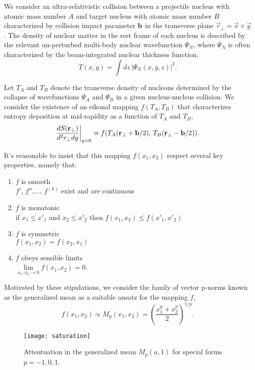 \documentclass[aps,prl,reprint,amsmath,nofootinbib]{revtex4-1}
\begin{document}
We consider an ultra-relativistic collision between a projectile nucleus with atomic mass number $A$ and target nucleus with atomic mass number $B$ characterized 
by collision impact parameter ${\bf b}$ in the transverse plane $\vec{r}_\perp = \vec{x} \times \vec{y}$. The density of nuclear matter in the rest frame of each 
nucleus is described by the relevant un-perturbed multi-body nuclear wavefunction $\Psi_N$, where $\Psi_N$ is often characterized by the beam-integrated 
nuclear thickness function,
\begin{equation}
 T(x,y) = \int dz\, \left|\Psi_N(x,y,z) \right|^2. 
\end{equation}

Let $T_A$ and $T_B$ denote the transverse density of nucleons determined by the collapse of wavefunctions $\Psi_A$ and $\Psi_B$ in a given nucleus-nucleus 
collision. We consider the existence of an eikonal mapping $f(T_A,T_B)$ that characterizes entropy deposition at mid-rapidity as a function of $T_A$ and $T_B$,
\begin{equation}
  \label{ansatz}
  \frac{dS({\bf r}_\perp)}{d^2r_\perp dy} \biggr \rvert_{y=0}  = f(T_A({\bf r}_\perp + {\bf b}/2),\,T_B({\bf r}_\perp - {\bf b}/2)).
\end{equation}

It's reasonable to insist that this mapping $f(x_1,x_2)$ respect several key properties, namely that:  
\begin{enumerate}
 \item{$f$ is smooth} \\ $f'$, $f''$,..., $f^{(k)}$ exist and are continuous
 \item{$f$ is monatonic} \\ if $x_1 \le x'_1$ and $x_2 \le x'_2$ then $f(x_1,x_2) \le f(x'_1,x'_2)$
 \item{$f$ is symmetric} \\ $f(x_1,x_2) = f(x_2,x_1)$
 \item{$f$ obeys sensible limits} \\ $\lim\limits_{x_1,x_2 \to 0} f(x_1,x_2) = 0$.
\end{enumerate}
Motivated by these stipulations, we consider the family of vector p-norms known as the generalized mean as a 
suitable ansatz for the mapping $f$,
\begin{equation}
 \label{generalized mean ansatz}
 f(x_1, x_2) \propto M_p(x_1,x_2) = \left( \frac{x_1^p + x_2^p}{2} \right)^{1/p}.
\end{equation}

\begin{figure}[b]
 \texttt{[image: saturation]}
 \caption{\label{saturation}Attentuation in the generalized mean $M_p(a, 1)$ for special forms $p=-1, 0, 1$.}
\end{figure}
\end{document}
